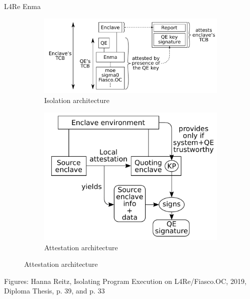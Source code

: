 \documentclass[aspectratio=169]{beamer}
\begin{document}
\begin{frame}{L4Re Enma}
    \begin{figure}
        \begin{subfigure}[]{0.6\textwidth}
            \includegraphics[width=\textwidth]{images/enma.png}
            \caption{Isolation architecture}
        \end{subfigure}
        \begin{subfigure}[]{0.35\textwidth}
            \includegraphics[width=\textwidth]{images/enma_remote_attestation.png}
            \caption{Attestation architecture}
        \end{subfigure}
    \end{figure}
    \footnotesize{Figures: Hanna Reitz, Isolating Program Execution on L4Re/Fiasco.OC, 2019, Diploma Thesis, p. 39, and p. 33}
\end{frame}
\end{document}
